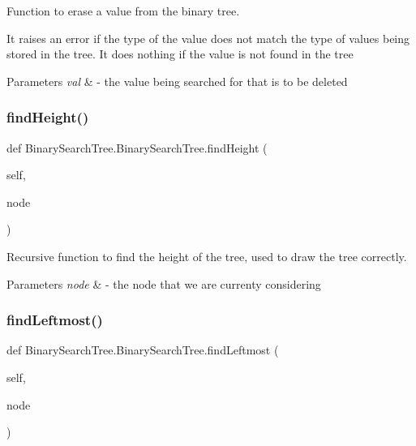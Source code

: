 Function to erase a value from the binary tree. 

It raises an error if the type of the value does not match the type of values being stored in the tree. It does nothing if the value is not found in the tree


\begin{DoxyParams}{Parameters}
{\em val} & -\/ the value being searched for that is to be deleted \\
\hline
\end{DoxyParams}
\mbox{\label{class_binary_search_tree_1_1_binary_search_tree_ac04f7b8898dddd138c18e9e0bc7b68ad}} 
\subsubsection{\texorpdfstring{find\+Height()}{findHeight()}}
{\footnotesize\ttfamily def Binary\+Search\+Tree.\+Binary\+Search\+Tree.\+find\+Height (\begin{DoxyParamCaption}\item[{}]{self,  }\item[{}]{node }\end{DoxyParamCaption})}



Recursive function to find the height of the tree, used to draw the tree correctly. 


\begin{DoxyParams}{Parameters}
{\em node} & -\/ the node that we are currenty considering \\
\hline
\end{DoxyParams}
\mbox{\label{class_binary_search_tree_1_1_binary_search_tree_a27ef9920f4c1e30e4d27cc4191d763f5}} 
\subsubsection{\texorpdfstring{find\+Leftmost()}{findLeftmost()}}
{\footnotesize\ttfamily def Binary\+Search\+Tree.\+Binary\+Search\+Tree.\+find\+Leftmost (\begin{DoxyParamCaption}\item[{}]{self,  }\item[{}]{node }\end{DoxyParamCaption})}



